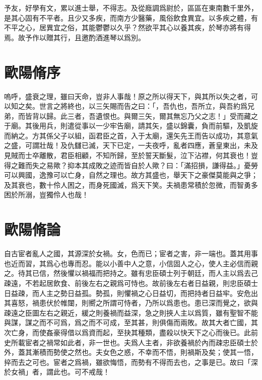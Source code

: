予友，好學有文，累以進士舉，不得志。及從廕調爲尉於，區區在東南數千里外，是其心固有不平者。且少又多疾，而南方少醫藥，風俗飲食異宜。以多疾之體，有不平之心，居異宜之俗，其能鬱鬱以久乎？然欲平其心以養其疾，於琴亦將有得焉。故予作以贈其行，且邀酌酒進琴以爲別。

\theendnotes

\section[五代史伶官傳序\quad{\small 歐陽脩}]{{\normalsize 歐陽脩}\quad{}序}
嗚呼，盛衰之理，雖曰天命，豈非人事哉！原之所以得天下，與其所以失之者，可以知之矣。世言之將終也，以三矢賜而告之曰：「，吾仇也，吾所立，與吾約爲兄弟，而皆背以歸。此三者，吾遺恨也。與爾三矢，爾其無忘乃父之志！」受而藏之于廟。其後用兵，則遣從事以一少牢告廟，請其矢，盛以錦囊，負而前驅，及凱旋而納之。方其係父子以組，函君臣之首，入于太廟，還矢先王而告以成功，其意氣之盛，可謂壯哉！及仇讎已滅，天下已定，一夫夜呼，亂者四應，蒼皇東出，未及見賊而士卒離散，君臣相顧，不知所歸，至於誓天斷髮，泣下沾襟，何其衰也！豈得之難而失之易歟？抑本其成敗之迹而皆自於人歟？曰：「滿招損，謙得益。」憂勞可以興國，逸豫可以{亡}身，自然之理也。故方其盛也，舉天下之豪傑莫能與之爭；及其衰也，數十伶人困之，而身死國滅，爲天下笑。夫禍患常積於忽微，而智勇多困於所溺，豈獨伶人也哉！%

\theendnotes

\section[五代史宦者傳論\quad{\small 歐陽脩}]{{\normalsize 歐陽脩}\quad{}論}
自古宦者亂人之國，其源深於女禍。女，色而已；宦者之害，非一端也。蓋其用事也近而習，其爲心也專而忍。能以小善中人之意，小信固人之心，使人主必信而親之。待其已信，然後懼以禍福而把持之。雖有忠臣碩士列于朝廷，而人主以爲去己疎遠，不若起居飲食、前後左右之親爲可恃也。故前後左右者日益親，則忠臣碩士日益疎，而人主之勢日益孤。勢孤，則懼禍之心日益切，而把持者日益牢。安危出其喜怒，禍患伏於帷闥，則嚮之所謂可恃者，乃所以爲患也。患已深而覺之，欲與疎遠之臣圖左右之親近，緩之則養禍而益深，急之則挾人主以爲質，雖有聖智不能與謀，謀之而不可爲，爲之而不可成，至其甚，則俱傷而兩敗。故其大者亡國，其次亡身，而使姦豪得借以爲資而起，至抉其種類，盡殺以快天下之心而後已。此前史所載宦者之禍常如此者，非一世也。夫爲人主者，非欲養禍於內而疎忠臣碩士於外，蓋其漸積而勢使之然也。夫女色之惑，不幸而不悟，則禍斯及矣；使其一悟，捽而去之可也。宦者之爲禍，雖欲悔悟，而勢有不得而去也，之事是已。故曰「深於女禍」者，謂此也。可不戒哉！

